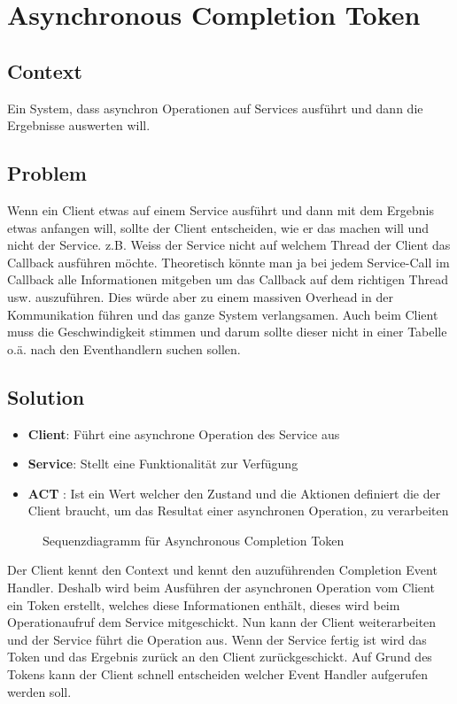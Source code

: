 \chapter{Asynchronous Completion Token}

\section{Context}
Ein System, dass asynchron Operationen auf Services ausführt und dann die Ergebnisse auswerten will.

\section{Problem}
Wenn ein Client etwas auf einem Service ausführt und dann mit dem Ergebnis etwas anfangen will, sollte der Client entscheiden, wie er das machen will und nicht der Service. z.B. Weiss der Service nicht auf welchem Thread der Client das Callback ausführen möchte. Theoretisch könnte man ja bei jedem Service-Call im Callback alle Informationen mitgeben um das Callback auf dem richtigen Thread usw. auszuführen. Dies würde aber zu einem massiven Overhead in der Kommunikation führen und das ganze System verlangsamen. Auch beim Client muss die Geschwindigkeit stimmen und darum sollte dieser nicht in einer Tabelle o.ä. nach den Eventhandlern suchen sollen.

\section{Solution}
\begin{itemize}
  \item \textbf{Client}: Führt eine asynchrone Operation des Service aus
  \item \textbf{Service}: Stellt eine Funktionalität zur Verfügung
  \item \textbf{ACT} : Ist ein Wert welcher den Zustand und die Aktionen definiert die der Client braucht, um das Resultat einer asynchronen Operation, zu verarbeiten
\end{itemize}

\begin{figure}[H]
  \centering
  
  \caption{Sequenzdiagramm f\"ur Asynchronous Completion Token}
\end{figure}

Der Client kennt den Context und kennt den auzuführenden Completion Event Handler. Deshalb wird beim Ausführen der asynchronen Operation vom Client ein Token erstellt, welches diese Informationen enthält, dieses wird beim Operationaufruf dem Service mitgeschickt. Nun kann der Client weiterarbeiten und der Service führt die Operation aus. Wenn der Service fertig ist wird das Token und das Ergebnis zurück an den Client zurückgeschickt. Auf Grund des Tokens kann der Client schnell entscheiden welcher Event Handler aufgerufen werden soll.

